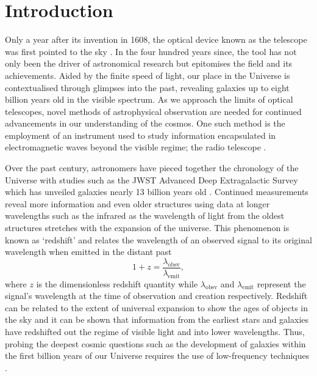 \chapter{Introduction}

\ifpdf
    \graphicspath{{introduction/figs/Raster/}{introduction/figs/PDF/}{introduction/figs/}}
\else
    \graphicspath{{introduction/figs/Vector/}{introduction/figs/}}
\fi


Only a year after its invention in 1608, the optical device known as the telescope was first pointed to the sky \citep{histTel}. In the four hundred years since, the tool has not only been the driver of astronomical research but epitomises the field and its achievements. Aided by the finite speed of light, our place in the Universe is contextualised through glimpses into the past, revealing galaxies up to eight billion years old in the visible spectrum. As we approach the limits of optical telescopes, novel methods of astrophysical observation are needed for continued advancements in our understanding of the cosmos. One such method is the employment of an instrument used to study information encapsulated in electromagnetic waves beyond the visible regime; the radio telescope \citep{smithObsAst}.

Over the past century, astronomers have pieced together the chronology of the Universe with studies such as the JWST Advanced Deep Extragalactic Survey which has unveiled galaxies nearly 13 billion years old \citep{jades}. Continued measurements reveal more information and even older structures using data at longer wavelengths such as the infrared \citep{abyss} as the wavelength of light from the oldest structures stretches with the expansion of the universe. This phenomenon is known as ‘redshift’ and relates the wavelength of an observed signal to its original wavelength when emitted in the distant past
\begin{equation}
    \label{eqn:redshift}
    1 + z = \frac{ \lambda_{\mathrm{obsv}} }{ \lambda_{\mathrm{emit}} },
\end{equation}
where $z$ is the dimensionless redshift quantity while $\lambda_{\mathrm{obsv}}$ and $\lambda_{\mathrm{emit}}$ represent the signal's wavelength at the time of observation and creation respectively. Redshift can be related to the extent of universal expansion to show the ages of objects in the sky and it can be shown that information from the earliest stars and galaxies have redshifted out the regime of visible light and into lower wavelengths. Thus, probing the deepest cosmic questions such as the development of galaxies within the first billion years of our Universe requires the use of low-frequency techniques \cite{furPhys}.

